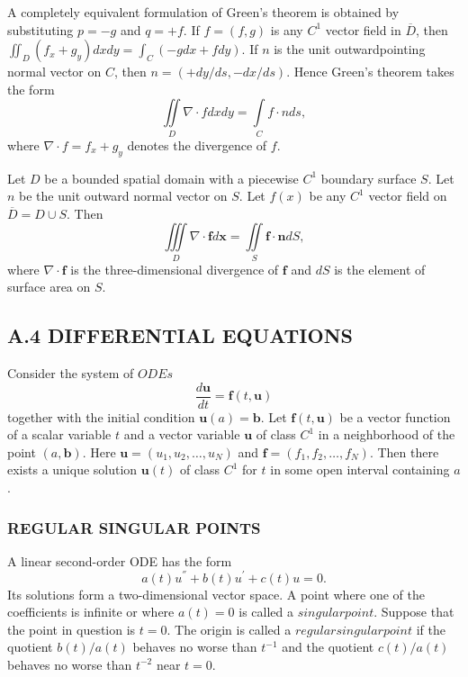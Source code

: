 \documentclass[hazy,blue,11pt]{elegantnote}
\begin{document}
A completely equivalent formulation of Green’s theorem is obtained by
substituting $p=-g$ and $q=+f$. If $f=(f,g)$ is any $C^1$ vector field in $\overline{D}$, then $\iint_D(f_x+g_y)dxdy=\int_C(-gdx+fdy)$. If $n$ is the unit outwardpointing normal vector on $C$, then $n=(+dy/ds,−dx/ds)$. Hence Green’s theorem takes the form
\begin{equation}
    \iint\limits_D \nabla\cdot fdxdy=\int\limits_C f\cdot nds,
\end{equation}
where $\nabla\cdot f = f_x + g_y$ denotes the divergence of $f$.

\begin{theorem}
    Let $D$ be a bounded spatial domain with a piecewise $C^1$ boundary surface $S$. Let $n$ be the unit outward normal vector on $S$. Let $f(x)$ be any $C^1$ vector field on $\overline{D} = D \cup S$. Then
\begin{equation}    \iiint\limits_D\nabla\cdot\textbf{f}d\textbf{x}=\iint\limits_S\textbf{f}\cdot\textbf{n}dS,
\end{equation}
where $\nabla\cdot\textbf{f}$ is the three-dimensional divergence of $\textbf{f}$ and $dS$ is the element of surface area on $S$.
\end{theorem}

\subsection{A.4 DIFFERENTIAL EQUATIONS}
\begin{theorem}
    Consider the system of $ODEs$
\begin{equation}
   \frac{d\mathbf{u}}{dt}=\mathbf{f}(t,\mathbf{u}) 
\end{equation}
together with the initial condition $\mathbf{u}(a)=\mathbf{b}$. Let $\mathbf{f}(t,\mathbf{u})$ be a vector function of a scalar variable $t$ and a vector variable $\mathbf{u}$ of class $C^1$ in a neighborhood of the point $(a,\mathbf{b})$. Here $\mathbf{u}=(u_{1},u_{2},\ldots,u_{N})$ and $\mathbf{f}=(f_{1},f_{2},\ldots,f_{N})$. Then there exists a unique solution $\mathbf{u}(t)$ of class $C^1$ for $t$ in some open interval containing $a$.
\end{theorem}

\subsubsection{REGULAR SINGULAR POINTS}
A linear second-order ODE has the form
\begin{equation}
    a(t)u^{''}+b(t)u^{'}+c(t)u=0.
\end{equation}
Its solutions form a two-dimensional vector space. A point where one of the coefficients is infinite or where $a(t) = 0$ is called a $singular point$. Suppose
that the point in question is $t = 0$. The origin is called a $regular singular point$
if the quotient $b(t)/a(t)$ behaves no worse than $t^{−1}$ and the quotient $c(t)/a(t)$ behaves no worse than $t^{−2}$ near $t = 0$.
\end{document}
